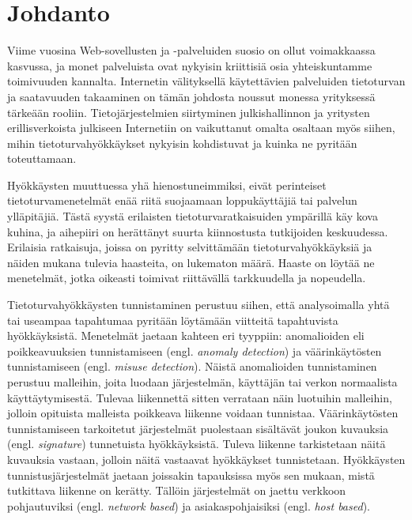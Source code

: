 
\chapter{Johdanto}

Viime vuosina Web-sovellusten ja -palveluiden suosio on 
ollut voimakkaassa kasvussa, ja monet palveluista ovat nykyisin kriittisiä osia
yhteiskuntamme toimivuuden kannalta. Internetin välityksellä
käytettävien palveluiden tietoturvan ja saatavuuden takaaminen on
tämän johdosta noussut monessa yrityksessä tärkeään rooliin.
Tietojärjestelmien siirtyminen julkishallinnon ja
yritysten erillisverkoista julkiseen Internetiin on vaikuttanut omalta
osaltaan myös siihen, mihin tietoturvahyökkäykset nykyisin
kohdistuvat ja kuinka ne pyritään toteuttamaan.

Hyökkäysten muuttuessa yhä hienostuneimmiksi, eivät perinteiset
tietoturvamenetelmät enää riitä suojaamaan loppukäyttäjiä tai palvelun
ylläpitäjiä. Tästä syystä erilaisten tietoturvaratkaisuiden ympärillä
käy kova kuhina, ja aihepiiri on herättänyt suurta kiinnostusta
tutkijoiden keskuudessa. Erilaisia ratkaisuja, joissa on pyritty
selvittämään tietoturvahyökkäyksiä ja näiden mukana tulevia haasteita,
on lukematon määrä. Haaste on löytää ne menetelmät, jotka oikeasti
toimivat riittävällä tarkkuudella ja nopeudella.

Tietoturvahyökkäysten tunnistaminen perustuu siihen, että
analysoimalla yhtä tai useampaa tapahtumaa pyritään löytämään
viitteitä tapahtuvista hyökkäyksistä. Menetelmät jaetaan kahteen eri
tyyppiin: anomalioiden eli poikkeavuuksien tunnistamiseen
(engl. \textit{anomaly detection}) ja väärinkäytösten tunnistamiseen
(engl. \textit{misuse detection}). Näistä anomalioiden tunnistaminen
perustuu malleihin, joita luodaan järjestelmän, käyttäjän tai verkon
normaalista käyttäytymisestä. Tulevaa liikennettä sitten verrataan 
näin luotuihin malleihin, jolloin opituista malleista poikkeava liikenne
voidaan tunnistaa. Väärinkäytösten tunnistamiseen tarkoitetut järjestelmät 
puolestaan sisältävät joukon kuvauksia (engl. \textit{signature}) tunnetuista hyökkäyksistä. 
Tuleva liikenne tarkistetaan näitä kuvauksia vastaan, jolloin näitä vastaavat
hyökkäykset tunnistetaan. Hyökkäysten tunnistusjärjestelmät
jaetaan joissakin tapauksissa myös sen mukaan, mistä tutkittava
liikenne on kerätty. Tällöin järjestelmät on jaettu verkkoon
pohjautuviksi (engl. \textit{network based}) ja asiakaspohjaisiksi
(engl. \textit{host based}).

